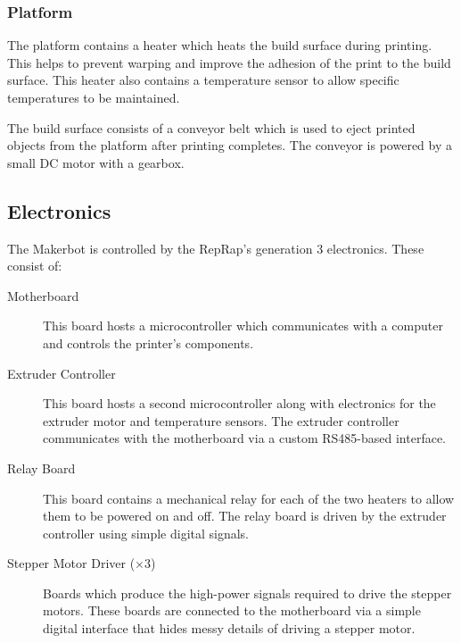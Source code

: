 			\subsubsection{Platform}
				
				The platform contains a heater which heats the build surface during
				printing. This helps to prevent warping and improve the adhesion of the
				print to the build surface. This heater also contains a temperature
				sensor to allow specific temperatures to be maintained.
				
				The build surface consists of a conveyor belt which is used to eject
				printed objects from the platform after printing completes. The conveyor
				is powered by a small DC motor with a gearbox.
				
		\subsection{Electronics}
		
			The Makerbot is controlled by the RepRap's generation 3 electronics. These
			consist of:
			\begin{description}
				
				\item[Motherboard] This board hosts a microcontroller which communicates
				with a computer and controls the printer's components.
				
				\item[Extruder Controller] This board hosts a second microcontroller
				along with electronics for the extruder motor and temperature sensors.
				The extruder controller communicates with the motherboard via a custom
				RS485-based interface.
				
				\item[Relay Board] This board contains a mechanical relay for each of
				the two heaters to allow them to be powered on and off. The relay board
				is driven by the extruder controller using simple digital signals.
				
				\item[Stepper Motor Driver ($\times 3$)] Boards which produce the
				high-power signals required to drive the stepper motors. These boards
				are connected to the motherboard via a simple digital interface that
				hides messy details of driving a stepper motor.
				
			\end{description}
			
		
